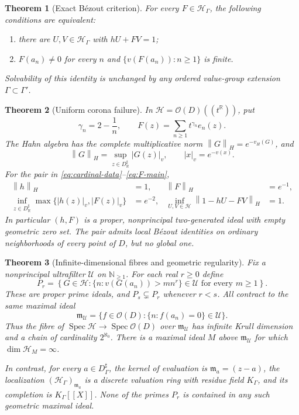 \documentclass[11pt,letterpaper]{article}
\numberwithin{equation}{section}
\newtheorem{theorem}{Theorem}[section]
\theoremstyle{definition}
\theoremstyle{remark}
\newcommand{\R}{\mathbb R}
\newcommand{\N}{\mathbb N}
\newcommand{\OO}{\mathcal O}
\newcommand{\HH}{\mathcal H}
\newcommand{\UU}{\mathcal U}
\newcommand{\mm}{\mathfrak m}
\newcommand{\vH}{v_{\!H}}
\newcommand{\Spec}{\operatorname{Spec}}
\newcommand{\norm}[1]{\left\lVert#1\right\rVert}
\begin{document}
\begin{theorem}[Exact B\'ezout criterion]\label{thm:main-bezout}
For every $F\in\HH_\Gamma$, the following conditions are equivalent:
\begin{enumerate}
\item there are $U,V\in\HH_\Gamma$ with $hU+FV=1$;
\item $F(a_n)\ne0$ for every $n$ and
      $\{v(F(a_n)):n\ge1\}$ is finite.
\end{enumerate}
Solvability of this identity is unchanged by any ordered value-group
extension $\Gamma\subset\Gamma'$.
\end{theorem}

\begin{theorem}[Uniform corona failure]\label{thm:main-corona}
In $\HH=\OO(D)((t^\R))$, put
\begin{equation}\label{eq:F-main}
 \gamma_n=2-\frac1n,\qquad
 F(z)=\sum_{n\ge1}t^{\gamma_n}e_n(z).
\end{equation}
The Hahn algebra has the complete multiplicative norm
$\norm{G}_H=e^{-\vH(G)}$, and
\[
 \norm{G}_H=\sup_{z\in D^\sharp_\R}|G(z)|_v,
 \qquad |x|_v=e^{-v(x)}.
\]
For the pair in \eqref{eq:cardinal-data}--\eqref{eq:F-main},
\begin{align*}
 \norm h_H&=1,&\norm F_H&=e^{-1},\\
 \inf_{z\in D^\sharp_\R}\max\{|h(z)|_v,|F(z)|_v\}&=e^{-2},&
 \inf_{U,V\in\HH}\norm{1-hU-FV}_H&=1.
\end{align*}
In particular $(h,F)$ is a proper, nonprincipal two-generated ideal with
empty geometric zero set. The pair admits local B\'ezout identities on
ordinary neighborhoods of every point of $D$, but no global one.
\end{theorem}

\begin{theorem}[Infinite-dimensional fibres and geometric regularity]
\label{thm:main-spectrum}
Fix a nonprincipal ultrafilter $\UU$ on $\N_{\ge1}$. For each real $r\ge0$
define
\begin{equation}\label{eq:Pr-intro}
 P_r=\left\{G\in\HH:
   \{n:v(G(a_n))>m n^r\}\in\UU\text{ for every }m\ge1\right\}.
\end{equation}
These are proper prime ideals, and $P_s\subsetneq P_r$ whenever $r<s$.
All contract to the same maximal ideal
\[
 \mm_\UU=\{f\in\OO(D):\{n:f(a_n)=0\}\in\UU\}.
\]
Thus the fibre of $\Spec\HH\to\Spec\OO(D)$ over $\mm_\UU$ has infinite
Krull dimension and a chain of cardinality $2^{\aleph_0}$. There is a
maximal ideal $M$ above $\mm_\UU$ for which $\dim\HH_M=\infty$.

In contrast, for every $a\in D^\sharp_\Gamma$, the kernel of evaluation is
$\mm_a=(z-a)$, the localization $(\HH_\Gamma)_{\mm_a}$ is a discrete
valuation ring with residue field $K_\Gamma$, and its completion is
$K_\Gamma[[X]]$. None of the primes $P_r$ is contained in any such
geometric maximal ideal.
\end{theorem}
\end{document}
